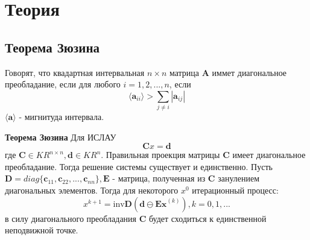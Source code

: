 \documentclass[a4paper,12pt]{article}
\begin{document}
    \section{Теория}
    \subsection{Теорема Зюзина}
    Говорят, что квадартная интервальная $ n \times n $ матрица $ \textbf{A} $ иммет диагональное преобладание, если для любого $ i = 1, 2, ..., n $, если
    \begin{equation}
        \langle \textbf{a}_{ii} \rangle > \sum_{j \neq i} | \textbf{a}_{ij} |
    \end{equation}
    $ \langle \textbf{a} \rangle $ - мигнитуда интервала. \newline
    
    \noindent\textbf{Теорема Зюзина} \newline
    Для ИСЛАУ
    \begin{equation}
        \textbf{C}x = \textbf{d}
    \end{equation}
    где $ \textbf{C} \in KR^{n \times n}, \textbf{d} \in KR^{n} $. Правильная проекция матрицы $ \textbf{C} $ имеет диагональное преобладание.
    Тогда решение системы существует и единственно.
    Пусть $ \textbf{D} = diag\{ \textbf{c}_{11}, \textbf{c}_{22}, ..., \textbf{c}_{nn} \}, \textbf{E} $ - матрица, полученная из $ \textbf{C} $ занулением диагональных элементов.
    Тогда для некоторого $ x^{0} $ итерационный процесс:
    \begin{equation}
        x^{k + 1} = \text{inv}\textbf{D}(\textbf{d} \ominus \textbf{Ex}^{(k)}), k = 0, 1, ...
        \label{eq:iterzyuzin}
    \end{equation}
    в силу диагонального преобладания $ \textbf{C} $ будет сходиться к единственной неподвижной точке.
\end{document}
